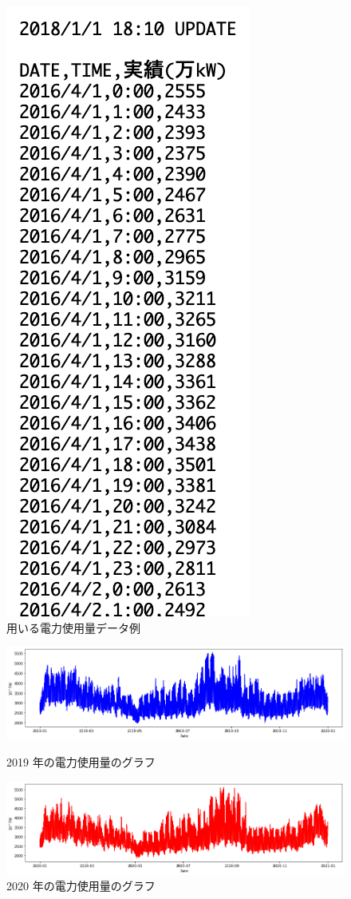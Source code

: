 \begin{figure}[hb]
\centering
\includegraphics[scale=0.5]{exe_csv.png}
 \caption{用いる電力使用量データ例}
\end{figure}
\begin{figure}[hb]
  \centering
\includegraphics[scale=0.5]{2019_W.png}
 \caption{2019 年の電力使用量のグラフ}
\includegraphics[scale=0.5]{2020_W.png}
 \caption{2020 年の電力使用量のグラフ}
\end{figure}

